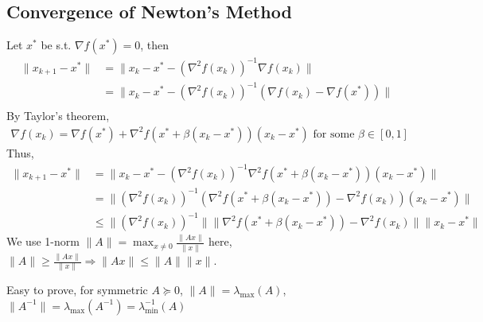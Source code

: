 \documentclass[11pt,a4paper]{article}
\begin{document}
\subsection{Convergence of Newton's Method}
Let $x^*$ be s.t. $\nabla f(x^*)=0$, then
\begin{equation}
    \begin{aligned}
        \|x_{k+1}-x^*\|&=\|x_k-x^*-(\nabla^2 f(x_k))^{-1}\nabla f(x_k)\|\\
        &=\|x_k-x^*-(\nabla^2 f(x_k))^{-1}(\nabla f(x_k)-\nabla f(x^*))\|\\
    \end{aligned}
    \nonumber
\end{equation}
By Taylor's theorem,
\begin{equation}
    \begin{aligned}
        \nabla f(x_k)=\nabla f(x^*)+\nabla^2 f(x^*+\beta(x_k-x^*))(x_k-x^*)\text{ for some }\beta\in[0,1]
    \end{aligned}
    \nonumber
\end{equation}
Thus,
\begin{equation}
    \begin{aligned}
        \|x_{k+1}-x^*\|
        &=\|x_k-x^*-(\nabla^2 f(x_k))^{-1}\nabla^2 f(x^*+\beta(x_k-x^*))(x_k-x^*)\|\\
        &=\|(\nabla^2 f(x_k))^{-1}(\nabla^2 f(x^*+\beta(x_k-x^*))-\nabla^2 f(x_k))(x_k-x^*)\|\\
        &\leq \|(\nabla^2 f(x_k))^{-1}\|\|\nabla^2 f(x^*+\beta(x_k-x^*))-\nabla^2 f(x_k)\|\|x_k-x^*\|
    \end{aligned}
    \nonumber
\end{equation}
We use 1-norm $\|A\|=\max_{x\neq 0}\frac{\|Ax\|}{\|x\|}$ here, $\|A\|\geq \frac{\|Ax\|}{\|x\|} \Rightarrow	\|Ax\|\leq \|A\|\|x\|$.

Easy to prove, for symmetric $A\succeq 0$, $\|A\|=\lambda_{\max}(A)$, $\|A^{-1}\|=\lambda_{\max}(A^{-1})=\lambda^{-1}_{\min}(A)$
\end{document}
